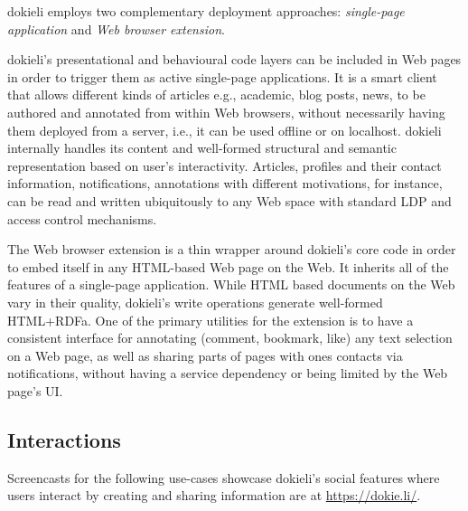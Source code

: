 \documentclass[a4paper]{llncs}
\begin{document}
                                
                                    
\par dokieli employs two complementary deployment approaches: \textit{single-page application} and \textit{Web browser extension}.

                                    
\par dokieli’s presentational and behavioural code layers can be included in Web pages in order to trigger them as active single-page applications. It is a smart client that allows different kinds of articles e.g., academic, blog posts, news, to be authored and annotated from within Web browsers, without necessarily having them deployed from a server, i.e., it can be used offline or on localhost. dokieli internally handles its content and well-formed structural and semantic representation based on user’s interactivity. Articles, profiles and their contact information, notifications, annotations with different motivations, for instance, can be read and written ubiquitously to any Web space with standard LDP and access control mechanisms.

                                    
\par The Web browser extension is a thin wrapper around dokieli’s core code in order to embed itself in any HTML-based Web page on the Web. It inherits all of the features of a single-page application. While HTML based documents on the Web vary in their quality, dokieli’s write operations generate well-formed HTML+RDFa. One of the primary utilities for the extension is to have a consistent interface for annotating (comment, bookmark, like) any text selection on a Web page, as well as sharing parts of pages with ones contacts via notifications, without having a service dependency or being limited by the Web page’s UI.
                                
                            

                            
                                \subsection{Interactions}
  \label{interactions}

                                
                                    
\par Screencasts for the following use-cases showcase dokieli’s social features where users interact by creating and sharing information are at \url{https://dokie.li/}.
\end{document}
